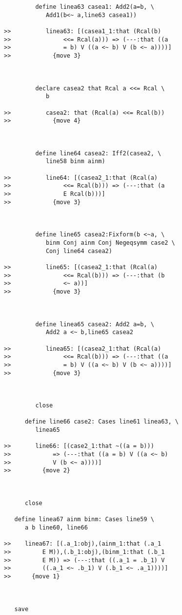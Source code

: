 \documentclass[12pt]{article}
\begin{document}
\begin{verbatim}
         define linea63 casea1: Add2(a=b, \
            Add1(b<~ a,line63 casea1))

>>          linea63: [(casea1_1:that (Rcal(b)
>>               <<= Rcal(a))) => (---:that ((a
>>               = b) V ((a <~ b) V (b <~ a))))]
>>            {move 3}



         declare casea2 that Rcal a <<= Rcal \
            b

>>          casea2: that (Rcal(a) <<= Rcal(b))
>>            {move 4}



         define line64 casea2: Iff2(casea2, \
            line58 binm ainm)

>>          line64: [(casea2_1:that (Rcal(a)
>>               <<= Rcal(b))) => (---:that (a
>>               E Rcal(b)))]
>>            {move 3}



         define line65 casea2:Fixform(b <~a, \
            binm Conj ainm Conj Negeqsymm case2 \
            Conj line64 casea2)

>>          line65: [(casea2_1:that (Rcal(a)
>>               <<= Rcal(b))) => (---:that (b
>>               <~ a))]
>>            {move 3}



         define linea65 casea2: Add2 a=b, \
            Add2 a <~ b,line65 casea2

>>          linea65: [(casea2_1:that (Rcal(a)
>>               <<= Rcal(b))) => (---:that ((a
>>               = b) V ((a <~ b) V (b <~ a))))]
>>            {move 3}



         close

      define line66 case2: Cases line61 linea63, \
         linea65

>>       line66: [(case2_1:that ~((a = b)))
>>            => (---:that ((a = b) V ((a <~ b)
>>            V (b <~ a))))]
>>         {move 2}



      close

   define linea67 ainm binm: Cases line59 \
      a b line60, line66

>>    linea67: [(.a_1:obj),(ainm_1:that (.a_1
>>         E M)),(.b_1:obj),(binm_1:that (.b_1
>>         E M)) => (---:that ((.a_1 = .b_1) V
>>         ((.a_1 <~ .b_1) V (.b_1 <~ .a_1))))]
>>      {move 1}



   save


\end{verbatim}
\end{document}
